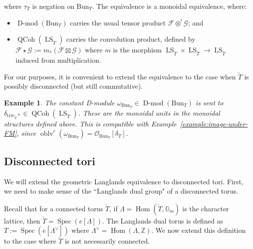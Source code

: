 \documentclass[11pt]{amsart}
\newcommand{\bG}{\mathbb{G}}
\newcommand{\cF}{\mathcal{F}}
\newcommand{\cG}{\mathcal{G}}
\newcommand{\Z}{{\mathbb Z}}
\newcommand{\cO}{{\mathcal O}}
\newcommand{\triv}{\mathrm{triv}}
\newcommand{\Spec}{\operatorname{Spec}}
\newcommand{\Bun}{{\mathrm{Bun}}}
\newcommand{\oblv}{\operatorname{oblv}}
\DeclareMathOperator{\Hom}{Hom}
\DeclareMathOperator{\QCoh}{QCoh}
\DeclareMathOperator{\Dmod}{D-mod}
\DeclareMathOperator{\LS}{LS}
\newtheorem{example}[thm]{Example}
\theoremstyle{remark}
\theoremstyle{definition}
\begin{document}
where $\tau_T$ is negation on $\Bun_T$. The equivalence is a monoidal equivalence, where:
\begin{itemize}
    \item $\Dmod(\Bun_T)$ carries the usual tensor product $\cF\otimes^!\cG$; and
    \item $\QCoh(\LS_{\check T})$ carries the convolution product, defined by $\cF\star\cG:=m_*(\cF\boxtimes\cG)$ where $m$ is the morphism $\LS_{\check T}\times\LS_{\check T}\to\LS_{\check T}$ induced from multiplication.
\end{itemize}
For our purposes, it is convenient to extend the equivalence to the case when $\check T$ is possibly disconnected (but still commutative). 
\begin{example}\label{ex:constant-D-module-under-GLC-tori}
    The constant D-module $\omega_{\Bun_T}\in\Dmod(\Bun_T)$ is sent to $\delta_{\triv_{\check T}*}\in\QCoh(\LS_{\check T})$. These are the monoidal units in the monoidal structures defined above. This is compatible with Example~\ref{example:image-under-FM}, since $\oblv^r(\omega_{\Bun_T})=\cO_{\Bun_T}[\delta_T]$.
\end{example}

\subsection{Disconnected tori}\label{subsec:disconnected-tori}
We will extend the geometric Langlands equivalence to disconnected tori. First, we need to make sense of the ``Langlands dual group" of a disconnected torus.

Recall that for a connected torus $\check T$, if $\Lambda=\Hom(\check T,\bG_m)$ is the character lattice, then $\check T=\Spec(e[\Lambda])$. The Langlands dual torus is defined as $T:=\Spec(e[\Lambda^\vee])$ where $\Lambda^\vee=\Hom(\Lambda,\Z)$. We now extend this definition to the case where $\check T$ is not necessarily connected.
\end{document}
